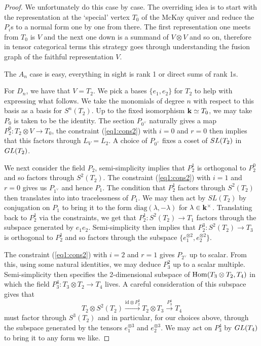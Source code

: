 \documentclass{amsart}
\theoremstyle{definition}
\begin{document}
\begin{proof}
We unfortunately do this case by case.
The overriding idea is to start with the representation at the `special' vertex $T_0$ of the McKay quiver and reduce the $P_i$s to a normal form one by one from there.
The first representation one meets from $T_0$ is $V$ and the next one down is a summand of $V \otimes V$ and so on, therefore in tensor categorical terms this strategy goes through understanding the fusion graph of the faithful representation $V$.

The $A_n$ case is easy, everything in sight is rank 1 or direct sums of rank 1s.

For $D_n$, we have that $V=T_2$.
We pick a bases $\{e_1,e_2\}$ for $T_2$ to help with expressing what follows.
We take the monomials of degree $n$ with respect to this basis as a basis for $S^n(T_2)$.
Up to the fixed isomorphism $\mathbf{k} \simeq T_0$, we may take $P_0$ is taken to be the identity.
The section $P_{0^\vee}$ naturally gives a map $P_2^0 \colon T_2 \otimes V \rightarrow T_0$, the constraint (\ref{eq1:cons2}) with $i=0$ and $r=0$ then implies that this factors through $L_V=L_2$.
A choice of $P_{0^\vee}$ fixes a coset of $SL(T_2)$ in $GL(T_2)$.

We next consider the field $P_2$, semi-simplicity implies that $P_2^1$ is orthogonal to $P_2^0$ and so factors through $S^2(T_2)$.
The constraint (\ref{eq1:cons2}) with $i=1$ and $r=0$ gives us $P_{1^\vee}$ and hence $P_1$.
The condition that $P_2^1$ factors through $S^2(T_2)$ then translates into into tracelessness of $P_1$.
We may then act by $SL(T_2)$ by conjugation on $P_1$ to bring it to the form $\text{diag}(\lambda,-\lambda)$ for $\lambda \in \mathbf{k}^\times$.
Translating back to $P_2^1$ via the constraints, we get that $P_2^1 \colon S^2(T_2) \rightarrow T_1$ factors through the subspace generated by $e_1 e_2$.
Semi-simplicity then implies that $P_2^3 \colon S^2(T_2) \rightarrow T_3$ is orthogonal to $P_2^1$ and so factors through the subspace $\{e_1^{\otimes 2}, e_2^{\otimes 2}\}$.

The constraint (\ref{eq1:cons2}) with $i=2$ and $r=1$ gives $P_{2^\vee}$ up to scalar.
From this, using some natural identities, we may deduce $P_3^2$ up to a scalar multiple.
Semi-simplicity then specifies the 2-dimensional subspace of $\operatorname{Hom}(T_3 \otimes T_2, T_4)$ in which the field $P_3^4 \colon T_3 \otimes T_2 \rightarrow T_4$ lives.
A careful consideration of this subspace gives that $$T_2 \otimes S^2(T_2) \xrightarrow{\text{id} \otimes P_2^3} T_2 \otimes T_3 \xrightarrow{P_3^4} T_4$$ must factor through $S^3(T_2)$ and in particular, for our choices above, through the subspace generated by the tensors $e_1^{\otimes 3}$ and $e_2^{\otimes 3}$.
We may act on $P_3^4$ by $GL(T_4)$ to bring it to any form we like.


\end{proof}
\end{document}
